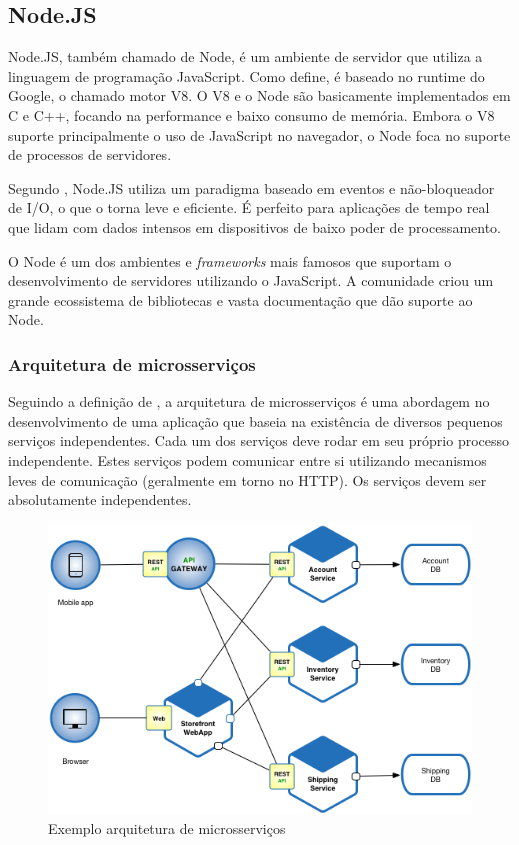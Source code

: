 \subsection{Node.JS}

Node.JS, também chamado de Node, é um ambiente de servidor que utiliza a linguagem de programação JavaScript. Como \cite{Tilkov2010} define, é baseado no runtime do Google, o chamado motor V8. O V8 e o Node são basicamente implementados em C e C++, focando na performance e baixo consumo de memória. Embora o V8 suporte principalmente o uso de JavaScript no navegador, o Node foca no suporte de processos de servidores.

Segundo \cite{Sapes2016}, Node.JS utiliza um paradigma baseado em eventos e não-bloqueador de I/O, o que o torna leve e eficiente. É perfeito para aplicações de tempo real que lidam com dados intensos em dispositivos de baixo poder de processamento.

O Node é um dos ambientes e \textit{frameworks} mais famosos que suportam o desenvolvimento de servidores utilizando o JavaScript. A comunidade criou um grande ecossistema de bibliotecas e vasta documentação que dão suporte ao Node. \cite{Tilkov2010}

\subsubsection{Arquitetura de microsserviços}

Seguindo a definição de \cite{ms1}, a arquitetura de microsserviços é uma abordagem no desenvolvimento de uma aplicação que baseia na existência de diversos pequenos serviços independentes. Cada um dos serviços deve rodar em seu próprio processo independente. Estes serviços podem comunicar entre si utilizando mecanismos leves de comunicação (geralmente em torno no HTTP). Os serviços devem ser absolutamente independentes.

\begin{figure}[htbp]
	\centering
	\includegraphics[width=1\linewidth]{figuras/Microservice_Architecture.png}
	\caption{Exemplo arquitetura de microsserviços}
	\label{fig:arquitetura-microsservicos}
\end{figure}

